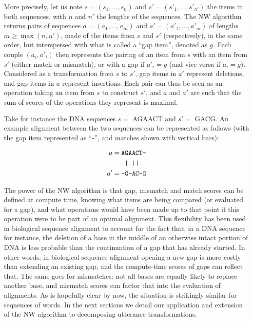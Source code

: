 More precisely, let us note \(s = (s_1, ..., s_n)\) and
\(s' = (s'_1, ..., s'_{n'})\) the items in both sequences, with \(n\)
and \(n'\) the lengths of the sequences. The NW algorithm returns pairs
of sequences \(a = (a_1, ..., a_m)\) and \(a' = (a'_1, ..., a'_m)\) of lengths \(m \geq \max(n, n')\), made of
the items from \(s\) and \(s'\) (respectively), in the same order, but
interspersed with what is called a \enquote{gap item}, denoted as \(g\). 
Each couple \((a_i, a'_i)\) then represents
the pairing of an item from \(s\) with an item from \(s'\) (either match
or mismatch), or with a gap if \(a'_i = g\) (and vice versa if
\(a_i = g\)). Considered as a transformation from \(s\) to \(s'\), gap
items in \(a'\) represent deletions, and gap items in \(a\) represent
insertions. Each pair can thus be seen as an operation taking an item
from \(s\) to construct \(s'\), and \(a\) and \(a'\) are such that the
sum of scores of the operations they represent is maximal.

Take for instance the DNA sequences \(s =\) AGAACT and \(s' =\) GACG. An
example alignment between the two sequences can be represented as
follows (with the gap item represented as \enquote{-}, and matches shown
with vertical bars):

\begin{align*}
  a  = {} & \text{\texttt{AGAACT-}} \\
       {} & \text{\texttt{  | ||}} \\
  a' = {} & \text{\texttt{-G-AC-G}}
\end{align*}

The power of the NW algorithm is that gap, mismatch and match scores can
be defined at compute time, knowing what items are being compared (or
evaluated for a gap), and what operations would have been made up to
that point if this operation were to be part of an optimal alignment.
This flexibility has been used in biological sequence alignment to
account for the fact that, in a DNA sequence for instance, the deletion
of a base in the middle of an otherwise intact portion of DNA is less
probable than the continuation of a gap that has already started. In
other words, in biological sequence alignment opening a new gap is more
costly than extending an existing gap, and the compute-time scores of
gaps can reflect that. The same goes for mismatches: not all bases are
equally likely to replace another base, and mismatch scores can factor
that into the evaluation of alignments. As is hopefully clear by now,
the situation is strikingly similar for sequences of words. In the next
sections we detail our application and extension of the NW algorithm to
decomposing utterance transformations.


